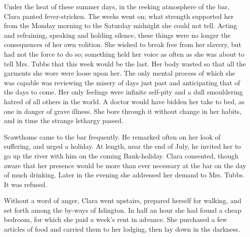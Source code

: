 Under the heat of these summer days, in the reeking atmosphere of the
bar, Clara panted fever-stricken. The weeks went on; what strength
supported her from the Monday morning to the Saturday midnight she could
not tell. Acting and refraining, speaking and holding silence, these
things were no longer the consequences of her own volition. She wished
to break free from her slavery, but had not the force to do so;
something held her voice as often as she was about to tell Mrs. Tubbs
that this week would be the last. Her body wasted so that all the
garments she wore were loose upon her. The only mental process of which
she was capable was reviewing the misery of days just past and
anticipating that of the days to come. Her only feelings were infinite
self-pity and a dull smouldering hatred of all others in the world. A
doctor would have bidden her take {}to bed, as one in danger of grave
illness. She bore through it without change in her habits, and in time
the strange lethargy passed.

Scawthome came to the bar frequently. He remarked often on her look of
suffering, and urged a holiday. At length, near the end of July, he
invited her to go up the river with him on the coming Bank-holiday.
Clara consented, though aware that her presence would be more than ever
necessary at the bar on the day of much drinking. Later in the evening
she addressed her demand to Mrs. Tubbs. It was refused.

Without a word of anger, Clara went upstairs, prepared herself for
walking, and set forth among the by-ways of Islington. In half an hour
she had found a cheap bedroom, for which she paid a week's rent in
advance. She purchased a few articles of food and carried them to her
lodging, then lay down in the darkness.
